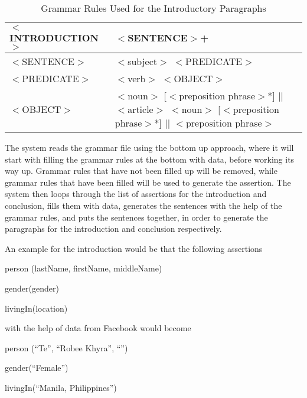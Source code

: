 \begin{table}[ph!]   %
	\centering
	\caption{Grammar Rules Used for the Introductory Paragraphs} \vspace{0.25em}
	\begin{tabular}{|p{2in}|p{2.5in}|} \hline
		$<$INTRODUCTION$>$ &$<$SENTENCE$>$+ \\ \hline
		$<$SENTENCE$>$ & $<$subject$>$ $<$PREDICATE$>$ \\ \hline
		$<$PREDICATE$>$ & $<$verb$>$ $<$OBJECT$>$ \\ \hline
		$<$OBJECT$>$ & $<$noun$>$ [$<$preposition phrase$>$*] $|$$|$ \newline
		$<$article$>$ $<$noun$>$ [$<$preposition phrase$>$*] $|$$|$\newline
		$<$preposition phrase$>$ \\ \hline
	\end{tabular}
	\label{tab:GrammarRules}
\end{table}
The system reads the grammar file using the bottom up approach, where it will start with filling the grammar rules at the bottom with data, before working its way up. Grammar rules that have not been filled up will be removed, while grammar rules that have been filled will be used to generate the assertion. The system then loops through the list of assertions for the introduction and conclusion, fills them with data, generates the sentences with the help of the grammar rules, and puts the sentences together, in order to generate the paragraphs for the introduction and conclusion respectively. 

An example for the introduction would be that the following assertions

\begin{center} person (lastName, firstName, middleName) \end{center}
\begin{center} gender(gender) \end{center}
\begin{center} livingIn(location) \end{center}

with the help of data from Facebook would become

\begin{center} person (``Te'', ``Robee Khyra'', ``'') \end{center}
\begin{center} gender(``Female'') \end{center}
\begin{center} livingIn(``Manila, Philippines'') \end{center}

